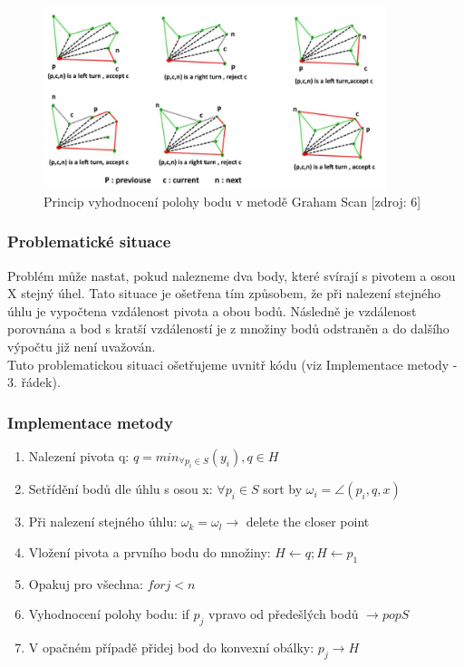 \documentclass[a4paper, 12pt]{article}
\begin{document}
\begin{figure}[h!]
	\centering
	\includegraphics[width=10cm]{graham_scan.jpg}
	\caption{Princip vyhodnocení polohy bodu v metodě Graham Scan [zdroj: 6]}
\end{figure}

\subsubsection{Problematické situace}
Problém může nastat, pokud nalezneme dva body, které svírají s pivotem a osou X stejný úhel. Tato situace je ošetřena tím způsobem, že při nalezení stejného úhlu je vypočtena vzdálenost pivota a obou bodů. Následně je vzdálenost porovnána a bod s kratší vzdáleností je z množiny bodů odstraněn a do dalšího výpočtu již není uvažován.\\

Tuto problematickou situaci ošetřujeme uvnitř kódu (viz Implementace metody - 3. řádek). 

\subsubsection{Implementace metody}
\begin{enumerate}
\item Nalezení pivota q:  $ q = min_{\forall p_i \in S} (y_i), q \in H $ 
\item Setřídění bodů dle úhlu s osou x: $ {\forall p_i \in S}$ sort by $ \omega_i = \angle (p_i, q, x)$
\item Při nalezení stejného úhlu: $ \omega_k = \omega_l \rightarrow $ delete the closer point 
\item Vložení pivota a prvního bodu do množiny: $ H \leftarrow q; H \leftarrow p_1$
\item Opakuj pro všechna: $ for j < n $
\item Vyhodnocení polohy bodu: if $ p_j $ vpravo od předešlých bodů $ \rightarrow pop S$
\item V opačném případě přidej bod do konvexní obálky: $ p_{j}  \rightarrow H $
\end{enumerate}
\end{document}
